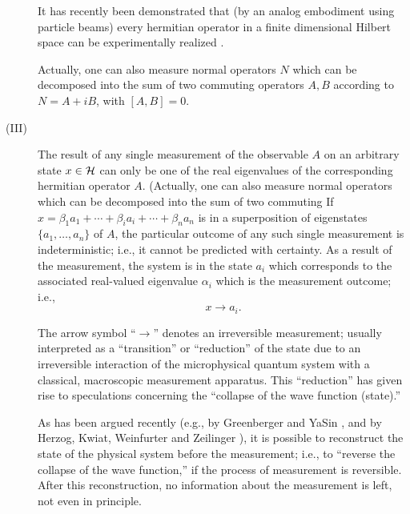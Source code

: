 \documentclass [11pt]{llncs}
\begin{document}
\begin{description}
It has recently been demonstrated that
(by an analog embodiment using
particle beams) every hermitian operator in a finite dimensional Hilbert
space can be experimentally realized \cite{rzbb}.

Actually, one can also measure normal operators $N$ which can be decomposed
into the sum of two commuting operators $A,B$ according to $N=A+iB$, with $[A,B]=0$.

\item[(III)]
The result of any single measurement of the observable $A$
on an arbitrary state $x\in {\cal H}$
can only be one of the real eigenvalues of the corresponding
hermitian operator $A$.
(Actually, one can also measure normal operators which can be decomposed
into the sum of two commuting
If $x=\beta_1a_1+\cdots +\beta_ia_i+\cdots  +\beta_na_n$ is in a
superposition of eigenstates $\{ a_1,\ldots ,a_n\}$ of
$A$, the
particular outcome of any such single measurement is indeterministic;
i.e.,
it cannot be predicted with certainty. As a
result of the measurement,
the system is in the state $a_i$ which corresponds to
the associated real-valued eigenvalue
$\alpha_i$ which is the measurement outcome; i.e.,
$$x\rightarrow a_i .$$

The arrow symbol ``$\rightarrow$'' denotes an irreversible measurement;
usually interpreted as a ``transition'' or ``reduction'' of the state
due to an irreversible interaction of the microphysical quantum
system with a classical, macroscopic  measurement apparatus.
This ``reduction''  has given rise to speculations
concerning the
``collapse
of the wave function (state).''

As has been argued recently
(e.g., by
Greenberger and YaSin
\cite{greenberger2}, and by
Herzog, Kwiat, Weinfurter and Zeilinger
\cite{hkwz}),
 it is
possible to reconstruct the state of the physical system before the
measurement; i.e., to
``reverse the
collapse of the wave function,'' if the process of measurement is
reversible. After this reconstruction, no information about the
measurement is left, not even in principle.


\end{description}
\end{document}
